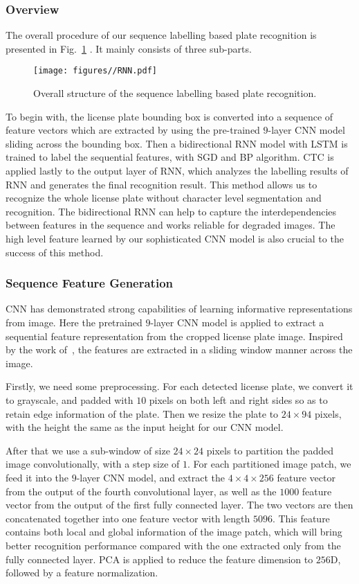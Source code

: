 \documentclass[twocolumn]{svjour3}
\begin{document}
\subsubsection{Overview}
The overall procedure of our sequence labelling based plate recognition is presented in Fig.~\ref{Fig:3} . It mainly consists of three sub-parts.

\begin{figure}[tb]
\centering
\texttt{[image: figures//RNN.pdf]}
\caption{Overall structure of the sequence labelling based plate recognition.}
\label{Fig:3}
\end{figure}To begin with, the license plate bounding box is converted into a sequence of feature vectors which are extracted by using the pre-trained $9$-layer CNN model sliding across the bounding box.
%
Then a bidirectional RNN model with LSTM is trained to label the sequential features, with SGD and BP algorithm. CTC is applied lastly to the output layer of RNN, which analyzes the labelling results of RNN and generates the final recognition result. This method allows us to recognize the whole license plate without character level segmentation and recognition. The bidirectional RNN can help to capture the interdependencies between features in the sequence and works reliable for degraded images. The high level feature learned by our sophisticated CNN model is also crucial to the success of this method.

\subsubsection{Sequence Feature Generation}
CNN has demonstrated strong capabilities of learning informative representations from image. Here the pretrained $9$-layer CNN model is applied to extract a sequential feature representation from the cropped license plate image. Inspired by the work of~\cite{Su2014ACCV,He2015Reading}, the features are extracted in a sliding window manner across the image.

Firstly, we need some preprocessing. For each detected license plate, we convert it to grayscale, and padded with $10$ pixels on both left and right sides so as to retain edge information of the plate. Then we resize the plate to $24 \times 94$ pixels, with the height the same as the input height for our CNN model. %

After that we use a sub-window of size $24 \times 24$ pixels to partition the padded image convolutionally, with a step size of $1$.  %
For each partitioned image patch, we feed it into the $9$-layer CNN model,  and extract the $4 \times 4 \times 256$ feature vector from the output of the fourth convolutional layer, as well as the $1000$ feature vector from the output of the first fully connected layer. The two vectors are then concatenated together into one feature vector with length $5096$.  This feature contains both local and global information of the image patch, which will bring better recognition performance compared with the one extracted only from the fully connected layer. PCA is applied to reduce the feature dimension to $256$D, followed by a feature normalization.
\end{document}
